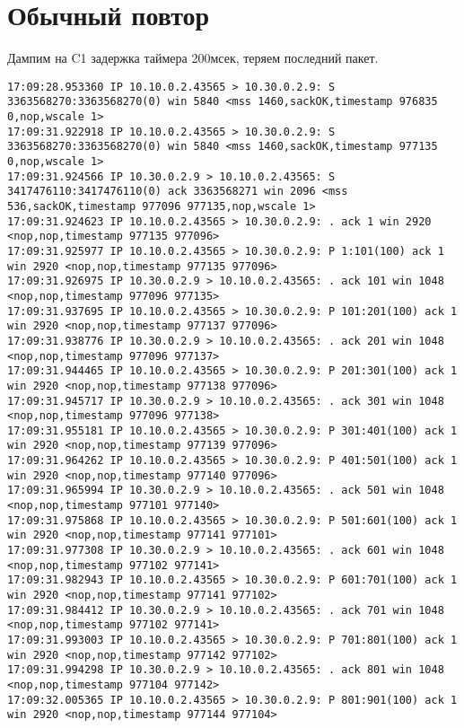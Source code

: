 \documentclass[a4paper,12pt]{article}
\begin{document}
\section{Обычный повтор}

Дампим на C1 задержка таймера 200мсек, теряем последний пакет.
\begin{Verbatim}
17:09:28.953360 IP 10.10.0.2.43565 > 10.30.0.2.9: S 3363568270:3363568270(0) win 5840 <mss 1460,sackOK,timestamp 976835 0,nop,wscale 1>
17:09:31.922918 IP 10.10.0.2.43565 > 10.30.0.2.9: S 3363568270:3363568270(0) win 5840 <mss 1460,sackOK,timestamp 977135 0,nop,wscale 1>
17:09:31.924566 IP 10.30.0.2.9 > 10.10.0.2.43565: S 3417476110:3417476110(0) ack 3363568271 win 2096 <mss 536,sackOK,timestamp 977096 977135,nop,wscale 1>
17:09:31.924623 IP 10.10.0.2.43565 > 10.30.0.2.9: . ack 1 win 2920 <nop,nop,timestamp 977135 977096>
17:09:31.925977 IP 10.10.0.2.43565 > 10.30.0.2.9: P 1:101(100) ack 1 win 2920 <nop,nop,timestamp 977135 977096>
17:09:31.926975 IP 10.30.0.2.9 > 10.10.0.2.43565: . ack 101 win 1048 <nop,nop,timestamp 977096 977135>
17:09:31.937695 IP 10.10.0.2.43565 > 10.30.0.2.9: P 101:201(100) ack 1 win 2920 <nop,nop,timestamp 977137 977096>
17:09:31.938776 IP 10.30.0.2.9 > 10.10.0.2.43565: . ack 201 win 1048 <nop,nop,timestamp 977096 977137>
17:09:31.944465 IP 10.10.0.2.43565 > 10.30.0.2.9: P 201:301(100) ack 1 win 2920 <nop,nop,timestamp 977138 977096>
17:09:31.945717 IP 10.30.0.2.9 > 10.10.0.2.43565: . ack 301 win 1048 <nop,nop,timestamp 977096 977138>
17:09:31.955181 IP 10.10.0.2.43565 > 10.30.0.2.9: P 301:401(100) ack 1 win 2920 <nop,nop,timestamp 977139 977096>
17:09:31.964262 IP 10.10.0.2.43565 > 10.30.0.2.9: P 401:501(100) ack 1 win 2920 <nop,nop,timestamp 977140 977096>
17:09:31.965994 IP 10.30.0.2.9 > 10.10.0.2.43565: . ack 501 win 1048 <nop,nop,timestamp 977101 977140>
17:09:31.975868 IP 10.10.0.2.43565 > 10.30.0.2.9: P 501:601(100) ack 1 win 2920 <nop,nop,timestamp 977141 977101>
17:09:31.977308 IP 10.30.0.2.9 > 10.10.0.2.43565: . ack 601 win 1048 <nop,nop,timestamp 977102 977141>
17:09:31.982943 IP 10.10.0.2.43565 > 10.30.0.2.9: P 601:701(100) ack 1 win 2920 <nop,nop,timestamp 977141 977102>
17:09:31.984412 IP 10.30.0.2.9 > 10.10.0.2.43565: . ack 701 win 1048 <nop,nop,timestamp 977102 977141>
17:09:31.993003 IP 10.10.0.2.43565 > 10.30.0.2.9: P 701:801(100) ack 1 win 2920 <nop,nop,timestamp 977142 977102>
17:09:31.994298 IP 10.30.0.2.9 > 10.10.0.2.43565: . ack 801 win 1048 <nop,nop,timestamp 977104 977142>
17:09:32.005365 IP 10.10.0.2.43565 > 10.30.0.2.9: P 801:901(100) ack 1 win 2920 <nop,nop,timestamp 977144 977104>

\end{Verbatim}
\end{document}
